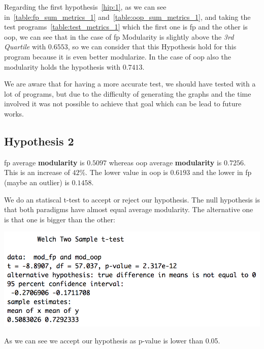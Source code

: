 \documentclass[12pt, a4paper]{article}
\begin{document}
Regarding the first hypothesis~\ref{hip:1}, as we can see in~\ref{table:fp_sum_metrics_1} and~\ref{table:oop_sum_metrics_1}, and taking
the test programs~\ref{table:test_metrics_1} which the first one is \acrshort{fp} and the other is \acrshort{oop}, we can see that in the case
of \acrshort{fp} Modularity is slightly above the \textit{3rd Quartile} with $0.6553$, so we can consider that this Hypothesis hold for this program because
it is even better modularize. In the case of \acrshort{oop} also the modularity holds the hypothesis with $0.7413$.

We are aware that for having a more accurate test, we should have tested with a lot of programs, but due to the difficulty of generating the graphs and the time
involved it was not possible to achieve that goal which can be lead to future works.

\subsection{Hypothesis 2}

\acrlong{fp} average \textbf{modularity} is $0.5097$ whereas \acrlong{oop} average \textbf{modularity} is $0.7256$. This is an increase of $42\%$.
The lower value in \acrlong{oop} is $0.6193$ and the lower in \acrlong{fp} (maybe an outlier) is $0.1458$. 

We do an statiscal t-test to accept or reject our hypothesis. The null hypothesis is that both paradigms have almost equal average modularity. The alternative one is that one is bigger than the other:

\begin{minipage}[t]{\linewidth}
    \includegraphics[width=\textwidth]{images/ttest.png}
    \captionsetup{type=figure}
    \label{fig:ttest}
  \end{minipage}

As we can see we accept our hypothesis as p-value is lower than 0.05.
\end{document}
